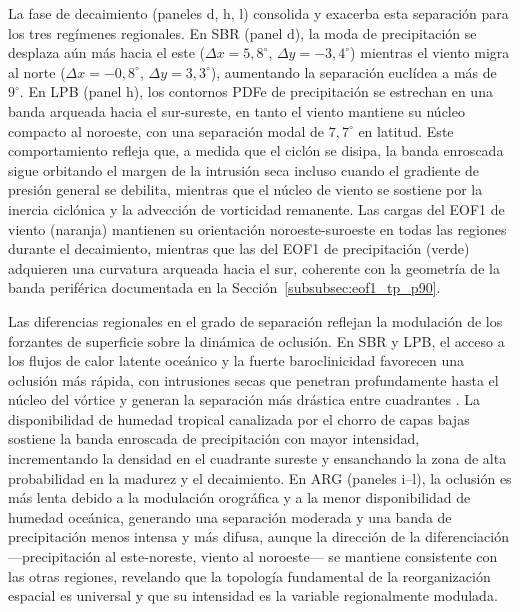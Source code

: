 La fase de decaimiento (paneles d, h, l) consolida y exacerba esta separación para los tres regímenes regionales. En SBR (panel d), la moda de precipitación se desplaza aún más hacia el este ($\Delta x = 5{,}8^{\circ}$, $\Delta y = -3{,}4^{\circ}$) mientras el viento migra al norte ($\Delta x = -0{,}8^{\circ}$, $\Delta y = 3{,}3^{\circ}$), aumentando la separación euclídea a más de $9^{\circ}$. En LPB (panel h), los contornos PDFe de precipitación se estrechan en una banda arqueada hacia el sur-sureste, en tanto el viento mantiene su núcleo compacto al noroeste, con una separación modal de $7{,}7^{\circ}$ en latitud. Este comportamiento refleja que, a medida que el ciclón se disipa, la banda enroscada sigue orbitando el margen de la intrusión seca incluso cuando el gradiente de presión general se debilita, mientras que el núcleo de viento se sostiene por la inercia ciclónica y la advección de vorticidad remanente. Las cargas del EOF1 de viento (naranja) mantienen su orientación noroeste-suroeste en todas las regiones durante el decaimiento, mientras que las del EOF1 de precipitación (verde) adquieren una curvatura arqueada hacia el sur, coherente con la geometría de la banda periférica documentada en la Sección~\ref{subsubsec:eof1_tp_p90}.

Las diferencias regionales en el grado de separación reflejan la modulación de los forzantes de superficie sobre la dinámica de oclusión. En SBR y LPB, el acceso a los flujos de calor latente oceánico y la fuerte baroclinicidad favorecen una oclusión más rápida, con intrusiones secas que penetran profundamente hasta el núcleo del vórtice y generan la separación más drástica entre cuadrantes \citep{gozzo2013air}. La disponibilidad de humedad tropical canalizada por el chorro de capas bajas \citep{vera2002cold} sostiene la banda enroscada de precipitación con mayor intensidad, incrementando la densidad en el cuadrante sureste y ensanchando la zona de alta probabilidad en la madurez y el decaimiento. En ARG (paneles i--l), la oclusión es más lenta debido a la modulación orográfica y a la menor disponibilidad de humedad oceánica, generando una separación moderada y una banda de precipitación menos intensa y más difusa, aunque la dirección de la diferenciación —precipitación al este-noreste, viento al noroeste— se mantiene consistente con las otras regiones, revelando que la topología fundamental de la reorganización espacial es universal y que su intensidad es la variable regionalmente modulada.

